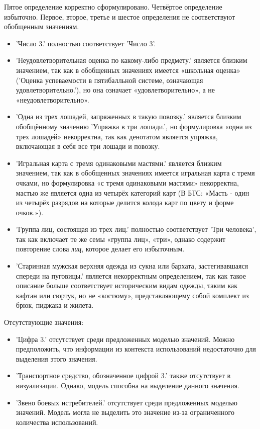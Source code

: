 \documentclass[LI,VKR]{HSEUniversity}
\begin{document}
Пятое определение корректно сформулировано.
Четвёртое определение избыточно.
Первое, второе, третье и шестое определения не соответствуют обобщенным значениям.

\begin{itemize}
    \item ’Число 3.’ полностью соответствует ’Число 3’.
\end{itemize}

\begin{itemize}
    \item ’Неудовлетворительная оценка по какому-либо предмету.’ является близким значением,
так как в обобщенных значениях имеется «школьная оценка»
(’Оценка успеваемости в пятибалльной системе, означающая удовлетворительно.’),
но она означает «удовлетворительно», а не «неудовлетворительно».

    \item ’Одна из трех лошадей, запряженных в такую повозку.’ является близким обобщённому
значению ’Упряжка в три лошади.’,
но формулировка «одна из трех лошадей» некорректна,
так как денотатом является упряжка, включающая в себя все три лошади и повозку.

    \item ’Игральная карта с тремя одинаковыми мастями.’ является близким значением,
так как в обобщенных значениях имеется игральная карта с тремя очками,
но формулировка «с тремя одинаковыми мастями» некорректна,
мастью же является одна из четырёх категорий карт (В БТС:
«Масть - один из четырёх разрядов на которые делится колода карт по цвету и форме очков.»).

    \item ’Группа лиц, состоящая из трех лиц.’ полностью соответствует
’Три человека’, так как включает те же семы «группа лиц», «три»,
однако содержит повторение слова \textit{лиц}, которое делает его избыточным.

    \item ’Старинная мужская верхняя одежда из сукна или бархата, застегивавшаяся спереди на пуговицы.’
является некорректным определением, так как такое описание больше соответствует
историческим видам одежды, таким как кафтан или сюртук, но не «костюму»,
представляющему собой комплект из брюк, пиджака и жилета.
\end{itemize}

Отсутствующие значения:
\begin{itemize}
    \item ’Цифра 3.’ отсутствует среди предложенных моделью значений.  %
Можно предположить, что информации из контекста использований недостаточно для выделения этого значения.

    \item ’Транспортное средство, обозначенное цифрой 3.’ также отсутствует в визуализации.
Однако, модель способна на выделение данного значения.  %

    \item ’Звено боевых истребителей.’ отсутствует среди предложенных моделью значений.  %
Модель могла не выделить это значение из-за ограниченного количества использований.
\end{itemize}
\end{document}
